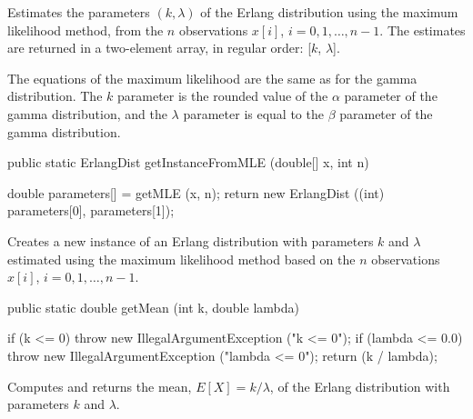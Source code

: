 \begin{tabb}
  Estimates the parameters $(k,\lambda)$ of the Erlang distribution
   using the maximum likelihood method, from the $n$ observations
   $x[i]$, $i = 0, 1,\ldots, n-1$. The estimates are returned in a two-element
    array, in regular order: [$k$, $\lambda$].
   \begin{detailed}
   The equations of the maximum likelihood are the same as for
   the gamma distribution. The $k$ parameter is the rounded value of the
   $\alpha$ parameter of the gamma distribution, and the $\lambda$ parameter
   is equal to the $\beta$ parameter of the gamma distribution.
   \end{detailed}
\end{tabb}
\begin{htmlonly}
\end{htmlonly}
\begin{code}

   public static ErlangDist getInstanceFromMLE (double[] x, int n)\begin{hide} {
      double parameters[] = getMLE (x, n);
      return new ErlangDist ((int) parameters[0], parameters[1]);
   }\end{hide}
\end{code}
\begin{tabb}
   Creates a new instance of an Erlang distribution with parameters $k$ and
   $\lambda$ estimated
   using the maximum likelihood method based on the $n$ observations $x[i]$,
   $i = 0, 1, \ldots, n-1$.
\end{tabb}
\begin{htmlonly}
\end{htmlonly}
\begin{code}

   public static double getMean (int k, double lambda)\begin{hide} {
      if (k <= 0)
         throw new IllegalArgumentException ("k <= 0");
      if (lambda <= 0.0)
         throw new IllegalArgumentException ("lambda <= 0");
      return (k / lambda);
   }\end{hide}
\end{code}
\begin{tabb}  Computes and returns the mean, $E[X] = k/\lambda$,
   of the Erlang distribution with parameters $k$ and $\lambda$.
\end{tabb}
